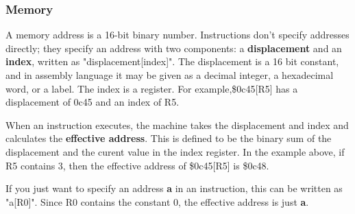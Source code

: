 \documentclass[11pt]{article}
\begin{document}
\subsubsection*{Memory}
\label{sec:org2167887}

A memory address is a 16-bit binary number.  Instructions don't
specify addresses directly; they specify an address with two
components: a \textbf{displacement} and an \textbf{index}, written as
"displacement[index]".  The displacement is a 16 bit constant, and in
assembly language it may be given as a decimal integer, a hexadecimal
word, or a label.  The index is a register.  For example,\$0c45[R5] has a
displacement of 0c45 and an index of R5.

When an instruction executes, the machine takes the displacement and
index and calculates the \textbf{effective address}.  This is defined to be
the binary sum of the displacement and the curent value in the index
register.  In the example above, if R5 contains 3, then the effective
address of \$0c45[R5] is \$0c48.

If you just want to specify an address \textbf{a} in an instruction, this can
be written as "a[R0]".  Since R0 contains the constant 0, the
effective address is just \textbf{a}.
\end{document}
